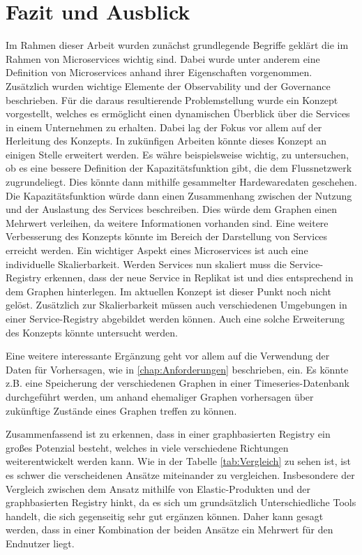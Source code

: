 \documentclass[
	12pt,
	BCOR=5mm,
	DIV=12,
	headinclude=on,
	footinclude=off,
	parskip=half,
	bibliography=totoc,
	listof=entryprefix,
	toc=listof,
	numbers=noenddot,
	plainfootsepline
]{scrreprt}
\begin{document}


\chapter{Fazit und Ausblick}

Im Rahmen dieser Arbeit wurden zunächst grundlegende Begriffe geklärt die im Rahmen von Microservices wichtig sind. Dabei wurde unter anderem eine Definition von Microservices anhand ihrer Eigenschaften vorgenommen. Zusätzlich wurden wichtige Elemente der Observability und der Governance beschrieben. Für die daraus resultierende Problemstellung wurde ein Konzept vorgestellt, welches es ermöglicht einen dynamischen Überblick über die Services in einem Unternehmen zu erhalten. Dabei lag der Fokus vor allem auf der Herleitung des Konzepts. In zukünfigen Arbeiten könnte dieses Konzept an einigen Stelle erweitert werden. Es währe beispielsweise wichtig, zu untersuchen, ob es eine bessere Definition der Kapazitätsfunktion gibt, die dem Flussnetzwerk zugrundeliegt. Dies könnte dann mithilfe gesammelter Hardewaredaten geschehen. Die Kapazitätsfunktion würde dann einen Zusammenhang zwischen der Nutzung und der Auslastung des Services beschreiben. Dies würde dem Graphen einen Mehrwert verleihen, da weitere Informationen vorhanden sind. Eine weitere Verbesserung des Konzepts könnte im Bereich der Darstellung von Services erreicht werden. Ein wichtiger Aspekt eines Microservices ist auch eine individuelle Skalierbarkeit. Werden Services nun skaliert muss die Service-Registry erkennen, dass der neue Service in Replikat ist und dies entsprechend in dem Graphen hinterlegen. Im aktuellen Konzept ist dieser Punkt noch nicht gelöst. Zusätzlich zur Skalierbarkeit müssen auch verschiedenen Umgebungen in einer Service-Registry abgebildet werden können. Auch eine solche Erweiterung des Konzepts könnte untersucht werden.

Eine weitere interessante Ergänzung geht vor allem auf die Verwendung der Daten für Vorhersagen, wie in \vref{chap:Anforderungen} beschrieben, ein. Es könnte z.B. eine Speicherung der verschiedenen Graphen in einer Timeseries-Datenbank durchgeführt werden, um anhand ehemaliger Graphen vorhersagen über zukünftige Zustände eines Graphen treffen zu können.

Zusammenfassend ist zu erkennen, dass in einer graphbasierten Registry ein großes Potenzial besteht, welches in viele verschiedene Richtungen weiterentwickelt werden kann. Wie in der Tabelle \vref{tab:Vergleich} zu sehen ist, ist es schwer die verscheidenen Ansätze miteinander zu vergleichen. Insbesondere der Vergleich zwischen dem Ansatz mithilfe von Elastic-Produkten und der graphbasierten Registry hinkt, da es sich um grundsätzlich Unterschiedliche Tools handelt, die sich gegenseitig sehr gut ergänzen können. Daher kann gesagt werden, dass in einer Kombination der beiden Ansätze ein Mehrwert für den Endnutzer liegt.
\clearpage
\ihead{}
\printbibliography[title=Literaturverzeichnis]
\cleardoublepage

\end{document}

